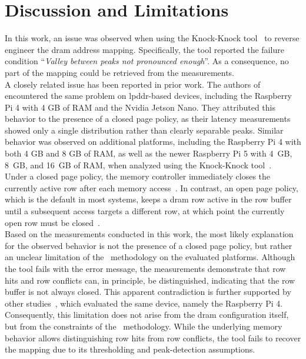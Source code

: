 \section{Discussion and Limitations} \label{sec:discussion-and-limitations}
  In this work, an issue was observed when using the Knock-Knock tool~\cite{toolKnockKnock} to 
  reverse engineer the \gls{dram} address mapping. Specifically, the tool reported the 
  failure condition “\textit{Valley between peaks not pronounced enough}”. As a 
  consequence, no part of the mapping could be retrieved from the measurements.
  \\
  A closely related issue has been reported in prior work. The authors of~\cite{paperKnockKnock} 
  encountered the same problem on \gls{lpddr}-based devices, including the Raspberry 
  Pi 4 with 4 GB of RAM and the Nvidia Jetson Nano. They attributed this 
  behavior to the presence of a closed page policy, as their latency measurements 
  showed only a single distribution rather than clearly separable peaks. Similar 
  behavior was observed on additional platforms, including the Raspberry Pi 4 
  with both 4 GB and 8 GB of RAM, as well as the newer Raspberry Pi 5 with 4~GB, 
  8~GB, and 16~GB of RAM, when analyzed using the Knock-Knock tool~\cite{toolKnockKnock}.
  \\
  Under a closed page policy, the memory controller immediately closes the 
  currently active row after each memory access~\cite{thesisPagePolicies, paperKnockKnock}. In contrast, an open 
  page policy, which is the default in most systems, keeps a \gls{dram} row active 
  in the row buffer until a subsequent access targets a different row, at which 
  point the currently open row must be closed~\cite{paperAnotherFlip, thesisPagePolicies}.
  \\
  Based on the measurements conducted in this work, the most likely 
  explanation for the observed behavior is not the presence of a closed page 
  policy, but rather an unclear limitation of the~\cite{paperKnockKnock} methodology on 
  the evaluated platforms. Although the tool fails with the error message, the measurements 
  demonstrate that row hits and row conflicts can, in principle, be 
  distinguished, indicating that the row buffer is not always closed. This 
  apparent contradiction is further supported by other studies~\cite{paperDRAMMaUT, paperMemoryAware}, which 
  evaluated the same device, namely the Raspberry Pi 4. Consequently, this 
  limitation does not arise from the \gls{dram} configuration itself, but from the 
  constraints of the~\cite{paperKnockKnock} methodology. While the underlying memory behavior 
  allows distinguishing row hits from row conflicts, the tool fails to recover the 
  mapping due to its thresholding and peak-detection assumptions.

